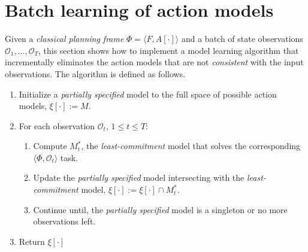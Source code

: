 \documentclass{article}
\newcommand{\tup}[1]{{\langle #1 \rangle}}
\begin{document}
\section{Batch learning of action models}
Given a {\em classical planning frame} $\Phi=\tup{F,A[\cdot]}$ and a batch of state observations $\mathcal{O}_1,\ldots,\mathcal{O}_T$, this section shows how to implement a model learning algorithm that incrementally eliminates the action models that are not {\em consistent} with the input observations. The algorithm is defined as follows. 
\begin{enumerate}
\item Initialize a {\em partially specified} model to the full space of possible action models, $\xi[\cdot]:=M$.
\item For each observation $\mathcal{O}_t$, {\tt\small $1\leq t\leq T$}:
\begin{enumerate}
\item Compute $M^*_t$, the {\em least-commitment} model that solves the corresponding $\tup{\Phi,\mathcal{O}_t}$ task.
\item Update the {\em partially specified} model intersecting with the {\em least-commitment} model, $\xi[\cdot]:=\xi[\cdot]\cap M^*_t$.
\item Continue until, the {\em partially specified} model is a singleton or no more observations left.
\end{enumerate}
\item Return $\xi[\cdot]$
\end{enumerate}

\end{document}
